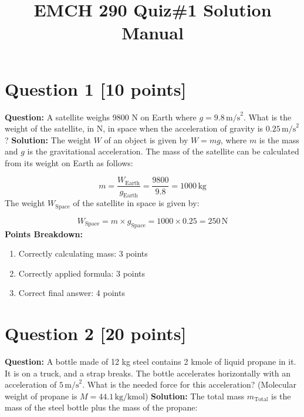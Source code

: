 \documentclass{article}
\title{EMCH 290 Quiz\#1 Solution Manual}
\date{}
\begin{document}
\maketitle

\section*{Question 1 [10 points]}

\textbf{Question:} A satellite weighs 9800 N on Earth where \( g = 9.8 \, \text{m/s}^2 \). What is the weight of the satellite, in N, in space when the acceleration of gravity is \( 0.25 \, \text{m/s}^2 \)?
\newline \newline
\textbf{Solution:} 
The weight \( W \) of an object is given by \( W = mg \), where \( m \) is the mass and \( g \) is the gravitational acceleration. The mass of the satellite can be calculated from its weight on Earth as follows:

\[
m = \frac{W_{\text{Earth}}}{g_{\text{Earth}}} = \frac{9800}{9.8} = 1000 \, \text{kg}
\]
\newline
The weight \( W_{\text{Space}} \) of the satellite in space is given by:

\[
W_{\text{Space}} = m \times g_{\text{Space}} = 1000 \times 0.25 = 250 \, \text{N}
\]
\newline
\textbf{Points Breakdown:}
\begin{enumerate}
    \renewcommand{\labelenumi}{\alph{enumi})}
    \item Correctly calculating mass: 3 points
    \item Correctly applied formula: 3 points
    \item Correct final answer: 4 points
\end{enumerate}



\newpage
\section*{Question 2 [20 points]}

\textbf{Question:} A bottle made of 12 kg steel contains 2 kmole of liquid propane in it. It is on a truck, and a strap breaks. The bottle accelerates horizontally with an acceleration of \(5 \, \text{m/s}^2\). What is the needed force for this acceleration? (Molecular weight of propane is \( M = 44.1 \, \text{kg/kmol} \))
\newline \newline
\textbf{Solution:} 
The total mass \(m_{\text{Total}}\) is the mass of the steel bottle plus the mass of the propane:
\end{document}
